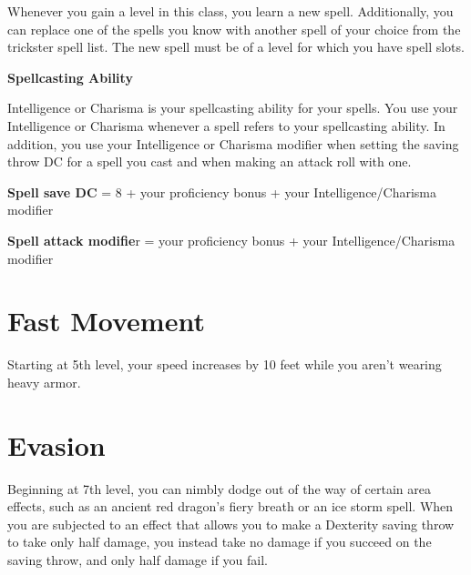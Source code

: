 \begin{multicols*}{2}
Whenever you gain a level in this class, you learn a new spell. Additionally, you can replace one of the spells you know with another spell of your choice from the trickster spell list. The new spell must be of a level for which you have spell slots.


\textbf{Spellcasting Ability}

Intelligence or Charisma is your spellcasting ability for your spells. You use your Intelligence or Charisma whenever a spell refers to your spellcasting ability. In addition, you use your Intelligence or Charisma modifier when setting the saving throw DC for a spell you cast and when making an attack roll with one.

\textbf{Spell save DC} = 8 + your proficiency bonus + your Intelligence/Charisma modifier

\textbf{Spell attack modifie}r = your proficiency bonus + your Intelligence/Charisma modifier


\section*{Fast Movement}

Starting at 5th level, your speed increases by 10 feet while you aren’t wearing heavy armor.


\section*{Evasion}

Beginning at 7th level, you can nimbly dodge out of the way of certain area effects, such as an ancient red dragon’s fiery breath or an ice storm spell. When you are subjected to an effect that allows you to make a Dexterity saving throw to take only half damage, you instead take no damage if you succeed on the saving throw, and only half damage if you fail.

    


\end{multicols*}
